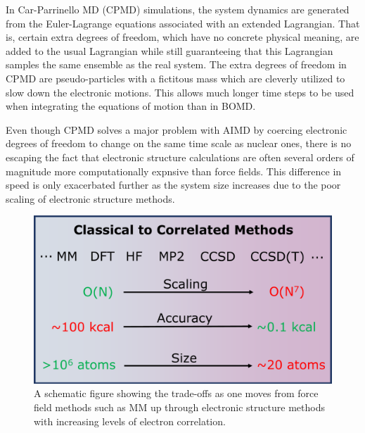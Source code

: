 \documentclass[11pt, proquest]{uwthesis}[2020/02/24]
\begin{document}
\par In Car-Parrinello MD (CPMD) simulations, the system dynamics are generated from the Euler-Lagrange equations associated with an extended Lagrangian. That is, certain extra degrees of freedom, which have no concrete physical meaning, are added to the usual Lagrangian while still guaranteeing that this Lagrangian samples the same ensemble as the real system. The extra degrees of freedom in CPMD are pseudo-particles with a fictitous mass which are cleverly utilized to slow down the electronic motions. This allows much longer time steps to be used when integrating the equations of motion than in BOMD.

\par Even though CPMD solves a major problem with AIMD by coercing electronic degrees of freedom to change on the same time scale as nuclear ones, there is no escaping the fact that electronic structure calculations are often several orders of magnitude more computationally expnsive than force fields. This difference in speed is only exacerbated further as the system size increases due to the poor scaling of electronic structure methods.

\begin{figure}
    \centering
    \includegraphics[width=\textwidth]{Figures/scaling_figure.pdf}
    \caption{A schematic figure showing the trade-offs as one moves from force field methods such as MM up through electronic structure methods with increasing levels of electron correlation.}
    \label{fig:es_scaling}
\end{figure}
\end{document}
